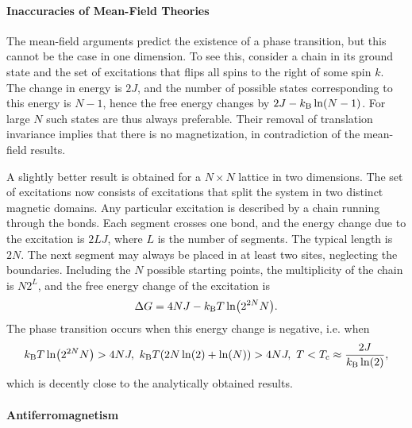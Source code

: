\paragraph{Inaccuracies of Mean-Field Theories}
The mean-field arguments predict the existence of a phase transition, but this cannot be the case in one dimension. To see this, consider a chain in its ground state and the set of excitations that flips all spins to the right of some spin $k$. The change in energy is $2J$, and the number of possible states corresponding to this energy is $N - 1$, hence the free energy changes by $2J - k_{\text{B}}\ln(N - 1)$. For large $N$ such states are thus always preferable. Their removal of translation invariance implies that there is no magnetization, in contradiction of the mean-field results.

A slightly better result is obtained for a $N\times N$ lattice in two dimensions. The set of excitations now consists of excitations that split the system in two distinct magnetic domains. Any particular excitation is described by a chain running through the bonds. Each segment crosses one bond, and the energy change due to the excitation is $2LJ$, where $L$ is the number of segments. The typical length is $2N$. The next segment may always be placed in at least two sites, neglecting the boundaries. Including the $N$ possible starting points, the multiplicity of the chain is $N2^{L}$, and the free energy change of the excitation is
\begin{align*}
	\Delta G = 4NJ - k_{\text{B}} T\ln(2^{2N}N).
\end{align*}
The phase transition occurs when this energy change is negative, i.e. when
\begin{align*}
	k_{\text{B}} T\ln(2^{2N}N) > 4NJ,\ k_{\text{B}} T(2N\ln(2) + \ln(N)) > 4NJ,\ T < T_{\text{c}} \approx \frac{2J}{k_{\text{B}}\ln(2)},
\end{align*}
which is decently close to the analytically obtained results.

\paragraph{Antiferromagnetism}